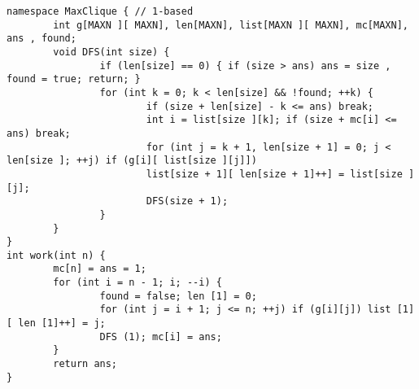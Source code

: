 \begin{lstlisting}
namespace MaxClique { // 1-based
        int g[MAXN ][ MAXN], len[MAXN], list[MAXN ][ MAXN], mc[MAXN], ans , found;
        void DFS(int size) {
                if (len[size] == 0) { if (size > ans) ans = size , found = true; return; }
                for (int k = 0; k < len[size] && !found; ++k) {
                        if (size + len[size] - k <= ans) break;
                        int i = list[size ][k]; if (size + mc[i] <= ans) break;
                        for (int j = k + 1, len[size + 1] = 0; j < len[size ]; ++j) if (g[i][ list[size ][j]])
                        list[size + 1][ len[size + 1]++] = list[size ][j];
                        DFS(size + 1);
                }
        }
}
int work(int n) {
        mc[n] = ans = 1;
        for (int i = n - 1; i; --i) {
                found = false; len [1] = 0;
                for (int j = i + 1; j <= n; ++j) if (g[i][j]) list [1][ len [1]++] = j;
                DFS (1); mc[i] = ans;
        }
        return ans;
}
\end{lstlisting}
